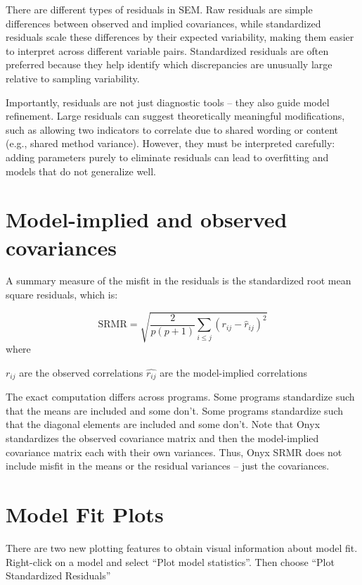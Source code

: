 \documentclass[
  letterpaper,
  DIV=11,
  numbers=noendperiod]{scrreprt}
\begin{document}
There are different types of residuals in SEM. Raw residuals are simple
differences between observed and implied covariances, while standardized
residuals scale these differences by their expected variability, making
them easier to interpret across different variable pairs. Standardized
residuals are often preferred because they help identify which
discrepancies are unusually large relative to sampling variability.

Importantly, residuals are not just diagnostic tools -- they also guide
model refinement. Large residuals can suggest theoretically meaningful
modifications, such as allowing two indicators to correlate due to
shared wording or content (e.g., shared method variance). However, they
must be interpreted carefully: adding parameters purely to eliminate
residuals can lead to overfitting and models that do not generalize
well.

\section{Model-implied and observed
covariances}\label{model-implied-and-observed-covariances}

A summary measure of the misfit in the residuals is the standardized
root mean square residuals, which is:

\[\mathrm{SRMR} = \sqrt{ \frac{2}{p(p+1)} \sum_{i \le j} \left( r_{ij} - \hat{r}_{ij} \right)^2 }\]
where

\(r_{ij}\) are the observed correlations \(\hat{r_{ij}}\) are the
model-implied correlations

The exact computation differs across programs. Some programs standardize
such that the means are included and some don't. Some programs
standardize such that the diagonal elements are included and some don't.
Note that Onyx standardizes the observed covariance matrix and then the
model-implied covariance matrix each with their own variances. Thus,
Onyx SRMR does not include misfit in the means or the residual variances
-- just the covariances.

\section{Model Fit Plots}\label{model-fit-plots}

There are two new plotting features to obtain visual information about
model fit. Right-click on a model and select ``Plot model statistics''.
Then choose ``Plot Standardized Residuals''
\end{document}
